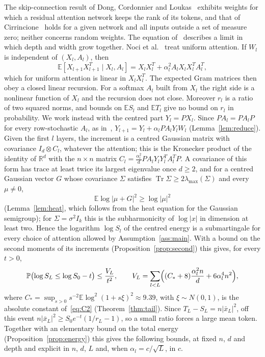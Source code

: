 \documentclass[11pt]{amsart}
\theoremstyle{definition}
\theoremstyle{remark}
\numberwithin{equation}{section}
\newcommand{\EE}{\mathbb{E}}
\newcommand{\PP}{\mathbb{P}}
\newcommand{\RR}{\mathbb{R}}
\DeclareMathOperator{\Tr}{Tr}
\begin{document}
The skip-connection result of Dong, Cordonnier and Loukas~\cite{DCL} exhibits weights for which a residual attention network keeps the rank of its tokens, and that of Cirrincione~\cite{Cir} holds for a given network and all inputs outside a set of measure zero; neither concerns random weights. The equation of~\cite{shaped} describes a limit in which depth and width grow together. Noci et al.~\cite{NABOSL} treat uniform attention. If $W_l$ is independent of $(X_l,A_l)$, then
\[
\EE[X_{l+1}X_{l+1}^{T}\mid X_l,A_l]=X_lX_l^{T}+\alpha_l^2A_lX_lX_l^{T}A_l^{T},
\]
which for uniform attention is linear in $X_lX_l^{T}$. The expected Gram matrices then obey a closed linear recursion. For a softmax $A_l$ built from $X_l$ the right side is a nonlinear function of $X_l$ and the recursion does not close. Moreover $r_l$ is a ratio of two squared norms, and bounds on $\EE S_l$ and $\EE T_l$ give no bound on $r_l$ in probability. We work instead with the centred part $Y_l=PX_l$. Since $PA_l=PA_lP$ for every row-stochastic $A_l$, as in~\cite{DCL}, $Y_{l+1}=Y_l+\alpha_lPA_lY_lW_l$ (Lemma~\ref{lem:reduce}). Given the first $l$ layers, the increment is a centred Gaussian matrix with covariance $I_d\otimes C_l$, whatever the attention; this is the Kronecker product of the identity of $\RR^d$ with the $n\times n$ matrix $C_l=\frac{\alpha_l^2}{d}PA_lY_lY_l^{T}A_l^{T}P$. A covariance of this form has trace at least twice its largest eigenvalue once $d\ge2$, and for a centred Gaussian vector $G$ whose covariance $\Sigma$ satisfies $\Tr\Sigma\ge2\lambda_{\max}(\Sigma)$ and every $\mu\ne0$,
\[
\EE\log|\mu+G|^2\ge\log|\mu|^2
\]
(Lemma~\ref{lem:heat}, which follows from the heat equation for the Gaussian semigroup); for $\Sigma=\sigma^2I_k$ this is the subharmonicity of $\log|x|$ in dimension at least two. Hence the logarithm $\log S_l$ of the centred energy is a submartingale for every choice of attention allowed by Assumption~\ref{ass:main}. With a bound on the second moments of its increments (Proposition~\ref{prop:second}) this gives, for every $t>0$,
\[
\PP\bigl(\log S_L\le\log S_0-t\bigr)\le\frac{V_L}{t^2},\qquad V_L=\sum_{l<L}\Bigl((C_*+8)\frac{\alpha_l^2n}{d}+6\alpha_l^4n^2\Bigr),
\]
where $C_*=\sup_{s>0}s^{-2}\EE\log^2(1+s\xi)^2\approx9.39$, with $\xi\sim N(0,1)$, is the absolute constant of~\eqref{eq:C2} (Theorem~\ref{thm:tail}). Since $T_L-S_L=n|\bar x_L|^2$, off this event $n|\bar x_L|^2\ge S_0e^{-t}(1/r_L-1)$, so a small ratio forces a large mean token. Together with an elementary bound on the total energy (Proposition~\ref{prop:energy}) this gives the following bounds, at fixed $n$, $d$ and depth and explicit in $n$, $d$, $L$ and, when $\alpha_l=c/\sqrt L$, in $c$.
\end{document}
